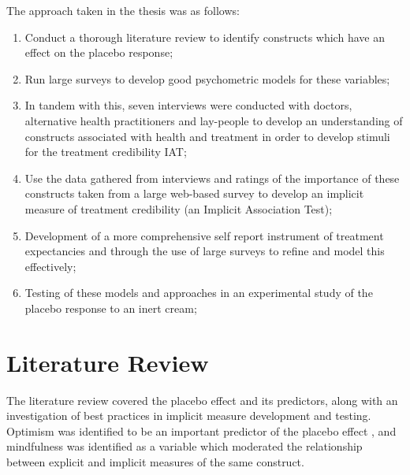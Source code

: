 \documentclass{article}
\begin{document}
The approach taken in the thesis was as follows:
\begin{enumerate}
\item Conduct a thorough literature review to identify constructs which have an effect on the placebo response;

\item Run large surveys to develop good psychometric models for these variables;

\item In tandem with this, seven interviews were conducted with doctors, alternative health practitioners and lay-people to develop an understanding of constructs associated with health and treatment in order to develop stimuli for the treatment credibility IAT;

\item Use the data gathered from interviews and ratings of the importance of these constructs taken from a large web-based survey to develop an implicit measure of treatment credibility (an Implicit Association Test);

\item Development of a more comprehensive self report instrument of treatment expectancies and through the use of large surveys to refine and model this effectively;

\item Testing of these models and approaches in an experimental study of the placebo response to an inert cream;

\end{enumerate}




\section{Literature Review}
\label{sec:literature-review}

The literature review covered the placebo effect and its predictors, along with an investigation of best practices in implicit measure development and testing. Optimism was identified to be an important predictor of the placebo effect \cite{Geers2005}, and mindfulness was identified as a variable which moderated the relationship between explicit and implicit measures of the same construct. 
\end{document}

